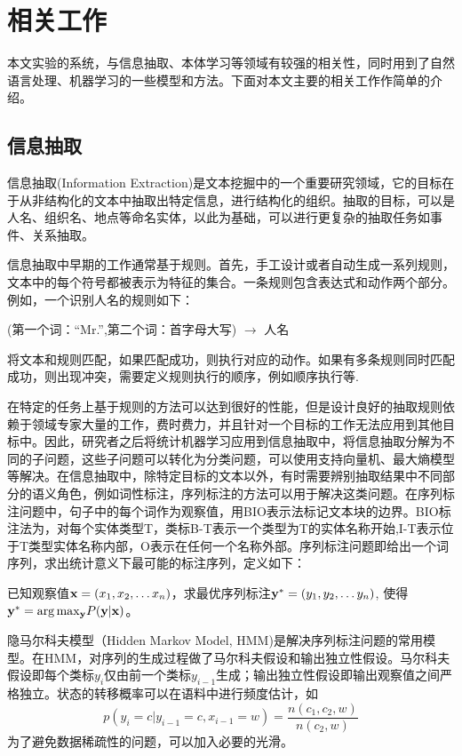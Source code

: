 \chapter{相关工作}
本文实验的系统，与信息抽取、本体学习等领域有较强的相关性，同时用到了自然语言处理、机器学习的一些模型和方法。下面对本文主要的相关工作作简单的介绍。
\section{信息抽取}

信息抽取(Information Extraction)是文本挖掘中的一个重要研究领域，它的目标在于从非结构化的文本中抽取出特定信息，进行结构化的组织。抽取的目标，可以是人名、组织名、地点等命名实体，以此为基础，可以进行更复杂的抽取任务如事件、关系抽取。

信息抽取中早期的工作通常基于规则\cite{ciravegna2001adaptive}。首先，手工设计或者自动生成一系列规则，文本中的每个符号都被表示为特征的集合。一条规则包含表达式和动作两个部分。例如，一个识别人名的规则如下：
\begin{center}
	(第一个词：``Mr.'',第二个词：首字母大写) $\rightarrow$ 人名
\end{center}
将文本和规则匹配，如果匹配成功，则执行对应的动作。如果有多条规则同时匹配成功，则出现冲突，需要定义规则执行的顺序，例如顺序执行等.

在特定的任务上基于规则的方法可以达到很好的性能，但是设计良好的抽取规则依赖于领域专家大量的工作，费时费力，并且针对一个目标的工作无法应用到其他目标中。因此，研究者之后将统计机器学习应用到信息抽取中，将信息抽取分解为不同的子问题，这些子问题可以转化为分类问题，可以使用支持向量机、最大熵模型等解决。在信息抽取中，除特定目标的文本以外，有时需要辨别抽取结果中不同部分的语义角色，例如词性标注，序列标注的方法可以用于解决这类问题。在序列标注问题中，句子中的每个词作为观察值，用BIO表示法标记文本块的边界。BIO标注法为，对每个实体类型T，类标B-T表示一个类型为T的实体名称开始,I-T表示位于T类型实体名称内部，O表示在任何一个名称外部。序列标注问题即给出一个词序列，求出统计意义下最可能的标注序列，定义如下：

\begin{problem}[序列标注]
已知观察值${\bf{x}} = ({x_1},{x_2}, \ldots {x_n})$，求最优序列标注${\bf{y^*}} = ({y_1},{y_2}, \ldots {y_n})$, 使得${{\bf{y}}^*} = \arg {\max _{\bf{y}}}P({\bf{y}}|{\bf{x}})$。
\end{problem}

隐马尔科夫模型（Hidden Markov Model, HMM)是解决序列标注问题的常用模型。在HMM，对序列的生成过程做了马尔科夫假设和输出独立性假设。马尔科夫假设即每个类标$y_i$仅由前一个类标$y_{i-1}$生成；输出独立性假设即输出观察值之间严格独立。状态的转移概率可以在语料中进行频度估计，如
\[
p(y_i=c|y_{i-1} = c, x_{i-1}=w) = \frac{n(c_1, c_2, w)}{n(c_2, w)}
\]
为了避免数据稀疏性的问题，可以加入必要的光滑。

